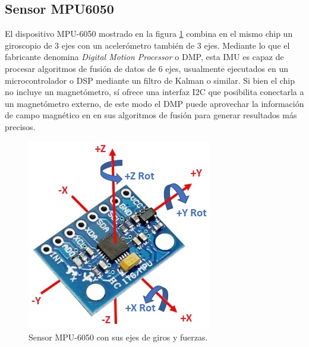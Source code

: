 
\subsection{Sensor MPU6050}\label{sec:mpu6050}

El dispositivo MPU-6050 mostrado en la figura \ref{fig:mpu6050} combina en el mismo chip un giroscopio de 3 ejes con un acelerómetro también de 3 ejes. Mediante lo que el fabricante denomina \textit{Digital Motion Processor} o DMP, esta IMU es capaz de procesar algoritmos de fusión de datos de 6 ejes, usualmente ejecutados en un microcontrolador o DSP mediante un filtro de Kalman o similar. Si bien el chip no incluye un magnetómetro, sí ofrece una interfaz I2C que posibilita conectarla a un magnetómetro externo, de este modo el DMP puede aprovechar la información de campo magnético en en sus algoritmos de fusión para generar resultados más precisos.

\begin{figure}[ht]
    \centering
    \includegraphics[scale=0.5]{./Figures/mpu6050.jpg}
    \caption{Sensor MPU-6050 con sus ejes de giros y fuerzas.\protect\footnotemark}
    \label{fig:mpu6050}
\end{figure}

